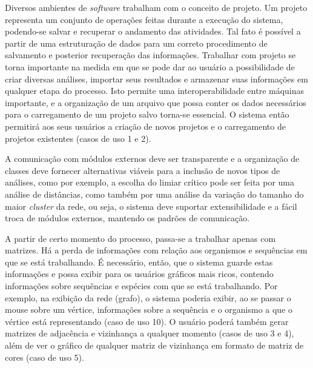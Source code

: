 Diversos ambientes de \textit{software} trabalham com o conceito de projeto. Um projeto
representa um conjunto de operações feitas durante a execução do sistema,
podendo-se salvar e recuperar o andamento das atividades. Tal fato é possível a partir de uma estruturação de dados para um correto procedimento de
salvamento e posterior recuperação das informações. Trabalhar com projeto se torna importante na medida em que se pode
dar ao usuário a possibilidade de criar
diversas análises, importar seus resultados e armazenar suas informações em qualquer etapa do processo.
Isto permite uma interoperabilidade entre máquinas importante, e a organização de um arquivo
que possa conter os dados necessários para o carregamento de um projeto salvo torna-se essencial. O sistema então permitirá aos seus usuários a criação de
novos projetos e o carregamento de projetos existentes (casos de uso 1 e 2).

A comunicação com módulos externos deve ser transparente e a organização de classes deve fornecer alternativas viáveis para a inclusão de novos
tipos de análises, como por exemplo, a escolha do limiar crítico pode ser feita por uma análise de distâncias, como também por uma análise da variação
do tamanho
do maior \textit{cluster} da rede, ou seja, o sistema deve suportar extensibilidade e a fácil troca de módulos externos, mantendo
os padrões de comunicação.

A partir de certo momento do processo, passa-se a trabalhar apenas com matrizes. Há a perda de informações com relação aos organismos e sequências em que
se está trabalhando. É necessário, então, que o sistema guarde estas informações e possa exibir para os usuários gráficos mais ricos, contendo informações
sobre sequências e espécies com que se está trabalhando. Por exemplo, na exibição da rede (grafo), o sistema poderia exibir, ao se passar o mouse sobre um
vértice,
informações sobre a sequência e o organismo a que o vértice está representando (caso de uso 10). O usuário poderá também gerar matrizes de adjacência e
vizinhança a qualquer momento (casos de uso 3 e 4), além de ver o gráfico de qualquer matriz de vizinhança em formato de matriz de cores (caso de uso 5).

